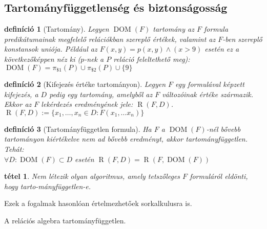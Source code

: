 \documentclass[fleqn,10pt,a4paper]{article}
\theoremstyle{magyar}
\newtheorem{de}{definíció}[section]
\newtheorem{te}{tétel}[section]
\DeclareMathOperator{\RR}{R}
\DeclareMathOperator{\dom}{DOM}
\begin{document}
  \subsection{Tartományfüggetlenség és biztonságosság}
  \begin{de}[Tartomány]
    Legyen $\dom(F)$ \emph{tartomány} az $F$ formula predikátumainak megfelelő relációkban szereplő értékek, valamint az $F$-ben szereplő
    konstansok uniója. Például az $F(x,y) = p(x,y) \land (x>9)$ esetén ez a következőképpen néz ki ($p$-nek a $P$ reláció
    feleltethető meg):\\
    \hspace*{0.5cm}$\dom(F) = \pi_{\$1}(P) \cup \pi_{\$2}(P)\cup\{9\}$
  \end{de}
  \begin{de}[Kifejezés értéke tartományon] Legyen $F$  egy formulával képzett kifejezés, a $D$ pedig egy tartomány,
    amelyből az $F$ változóinak értéke származik. Ekkor az $F$ lekérdezés eredményének jele: $\RR(F,D)$.\\
    \hspace*{0.5cm}$\RR(F,D) := \{ x_1,\ldots,x_n\in D : F(x_1,\ldots x_n)\}$
  \end{de}
  
  \begin{de}[Tartományfüggetlen formula] Ha $F$ a  $\dom(F)$-nél bővebb tartományon kiértékelve nem ad bővebb eredményt,
    akkor tartományfüggetlen. Tehát:\\
    \hspace*{0.5cm}$\forall D\colon \dom(F)\subset D$ esetén $\RR(F,D) = \RR(F,\dom(F))$
  \end{de}
  
  \begin{te} Nem létezik olyan algoritmus, amely tetszőleges $F$ formuláról eldönti, hogy tarto-mányfüggetlen-e.
  \end{te}
  
  Ezek a fogalmak hasonlóan értelmezhetőek sorkalkulusra is.
  
  A relációs algebra tartományfüggetlen.
\end{document}
